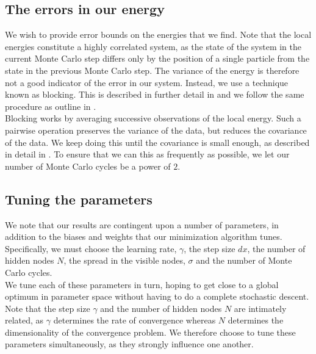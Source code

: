 \documentclass[a4paper, 10pt]{article}
\begin{document}
	\subsection{The errors in our energy}
	We wish to provide error bounds on the energies that we find. Note that the local energies constitute a highly correlated system, as the state of the system in the current Monte Carlo step differs only by the position of a single particle from the state in the previous Monte Carlo step. The variance of the energy is therefore not a good indicator of the error in our system. Instead, we use a technique known as blocking. This is described in further detail in \cite{Jonsson2018} and we follow the same procedure as outline in \cite{Heinsen2018}.\\
	\linebreak
	Blocking works by averaging successive observations of the local energy. Such a pairwise operation preserves the variance of the data, but reduces the covariance of the data. We keep doing this until the covariance is small enough, as described in detail in \cite{Jonsson2018}. To ensure that we can this as frequently as possible, we let our number of Monte Carlo cycles be a power of $2$. 
	\subsection{Tuning the parameters}\label{sec:met_tuning_parameters}
	We note that our results are contingent upon a number of parameters, in addition to the biases and weights that our minimization algorithm tunes. Specifically, we must choose the learning rate, $\gamma$, the step size $dx$, the number of hidden nodes $N$, the spread in the visible nodes, $\sigma$ and the number of Monte Carlo cycles.\\
	\linebreak
	We tune each of these parameters in turn, hoping to get close to a global optimum in parameter space without having to do a complete stochastic descent. Note that the step size $\gamma$ and the number of hidden nodes $N$ are intimately related, as $\gamma$ determines the rate of convergence whereas $N$ determines the dimensionality of the convergence problem. We therefore choose to tune these parameters simultaneously, as they strongly influence one another.
\end{document}
